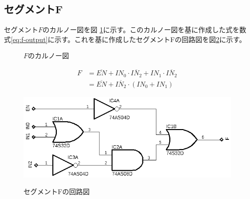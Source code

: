 \documentclass[a4paper,11pt,dvipdfmx]{jsarticle}
\begin{document}
\subsection{セグメントF}
セグメント$F$のカルノー図を図 \ref{fig:karnoF}に示す。このカルノー図を基に作成した式を数式\eqref{eq:f-output}に示す。これを基に作成したセグメントFの回路図を図\ref{fig:segF}に示す。
\begin{figure}[htbp]
  \centering
  \caption{\(F\)のカルノー図}
  \label{fig:karnoF}
\end{figure}
\begin{align}
  F &= \overline{EN} + IN_0 \cdot \overline{IN_2} + IN_1 \cdot \overline{IN_2}\label{eq:f-output}\\
  &= \overline{EN} + \overline{IN_2} \cdot (IN_0 + IN_1) \label{eq:f-output1}
\end{align}
\begin{figure}[htbp]
  \centering
  \includegraphics{./images/F.png}
  \label{fig:segF}
  \caption{セグメントFの回路図}
\end{figure}
\newpage
\end{document}
